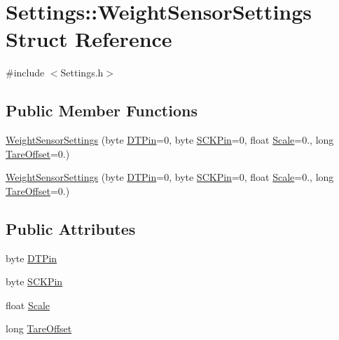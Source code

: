 \hypertarget{struct_settings_1_1_weight_sensor_settings}{}\section{Settings\+:\+:Weight\+Sensor\+Settings Struct Reference}
\label{struct_settings_1_1_weight_sensor_settings}


{\ttfamily \#include $<$Settings.\+h$>$}

\subsection*{Public Member Functions}
\begin{DoxyCompactItemize}
\item 
\hyperlink{struct_settings_1_1_weight_sensor_settings_a5ee032c73c5c1f52c63df77119e31398}{Weight\+Sensor\+Settings} (byte \hyperlink{struct_settings_1_1_weight_sensor_settings_a014112a3732571b30963d2df0d3f5527}{D\+T\+Pin}=0, byte \hyperlink{struct_settings_1_1_weight_sensor_settings_a07dc605f30f893853253191cbd167357}{S\+C\+K\+Pin}=0, float \hyperlink{struct_settings_1_1_weight_sensor_settings_a1adaf0dcb0fea29c34b913cf03ea0c0a}{Scale}=0., long \hyperlink{struct_settings_1_1_weight_sensor_settings_af22f3736de063e3d85e202058e0b69a0}{Tare\+Offset}=0.)
\item 
\hyperlink{struct_settings_1_1_weight_sensor_settings_a5ee032c73c5c1f52c63df77119e31398}{Weight\+Sensor\+Settings} (byte \hyperlink{struct_settings_1_1_weight_sensor_settings_a014112a3732571b30963d2df0d3f5527}{D\+T\+Pin}=0, byte \hyperlink{struct_settings_1_1_weight_sensor_settings_a07dc605f30f893853253191cbd167357}{S\+C\+K\+Pin}=0, float \hyperlink{struct_settings_1_1_weight_sensor_settings_a1adaf0dcb0fea29c34b913cf03ea0c0a}{Scale}=0., long \hyperlink{struct_settings_1_1_weight_sensor_settings_af22f3736de063e3d85e202058e0b69a0}{Tare\+Offset}=0.)
\end{DoxyCompactItemize}
\subsection*{Public Attributes}
\begin{DoxyCompactItemize}
\item 
byte \hyperlink{struct_settings_1_1_weight_sensor_settings_a014112a3732571b30963d2df0d3f5527}{D\+T\+Pin}
\item 
byte \hyperlink{struct_settings_1_1_weight_sensor_settings_a07dc605f30f893853253191cbd167357}{S\+C\+K\+Pin}
\item 
float \hyperlink{struct_settings_1_1_weight_sensor_settings_a1adaf0dcb0fea29c34b913cf03ea0c0a}{Scale}
\item 
long \hyperlink{struct_settings_1_1_weight_sensor_settings_af22f3736de063e3d85e202058e0b69a0}{Tare\+Offset}
\end{DoxyCompactItemize}


